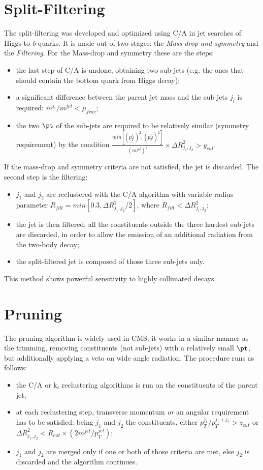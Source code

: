 \section{Split-Filtering}
The split-filtering was developed and optimized using C/A in jet searches of Higgs to \textit{b}-quarks. It is made out of two stages: the \textit{Mass-drop and symmetry} and the \textit{Filtering}.
For the Mass-drop and symmetry these are the steps:
\begin{itemize}
 \item the last step of C/A is undone, obtaining two sub-jets (e.g. the ones that should contain the bottom quark from Higgs decay);
 \item a significant difference between the parent jet mass and the sub-jets $j_i$ is required: $m^{j_i}/m^{jet}<\mu_{frac}$;
 \item the two $\pt$ of the sub-jets are required to be relatively similar (symmetry requirement) by the condition $\frac{min[(p_T^{j_1})^2,(p_T^{j_2})^2]}{(m^{jet})^2}\times \Delta R^2_{j_1,j_2} > y_{cut}$.
\end{itemize}
If the mass-drop and symmetry criteria are not satisfied, the jet is discarded.
The second step is the filtering:
\begin{itemize}
 \item $j_1$ and $j_2$ are reclustered with the C/A algorithm with variable radius parameter $R_{filt}=min[0.3,\Delta R^2_{j_1,j_2}/2]$, where $R_{filt}<\Delta R^2_{j_1,j_2}$;
 \item the jet is then filtered: all the constituents outside the three hardest sub-jets are discarded, in order to allow the emission of an additional radiation from the two-body decay;
 \item the split-filtered jet is composed of those three sub-jets only.
\end{itemize}
This method shows powerful sensitivity to highly collimated decays.

\section{Pruning}
The pruning algorithm is widely used in CMS; it works in a similar manner as the trimming, removing constituents (not sub-jets) with a relatively small $\pt$, but additionally applying a veto on wide angle radiation. The procedure runs as follows:
\begin{itemize}
 \item the C/A or k$_t$ reclustering algorithms is run on the constituents of the parent jet;
 \item at each reclustering step, transverse momentum \textit{or} an angular requirement has to be satisfied: being $j_1$ and $j_2$ the constituents, either $p_T^{j_1}/p_T^{j_1+j_2}>z_{cut}$ or $\Delta R^2_{j_1,j_2}< R_{cut}\times (2m^{jet}/p_T^{jet})$;
 \item $j_1$ and $j_2$ are merged only if one or both of those criteria are met, else $j_2$ is discarded and the algorithm continues.
\end{itemize}

